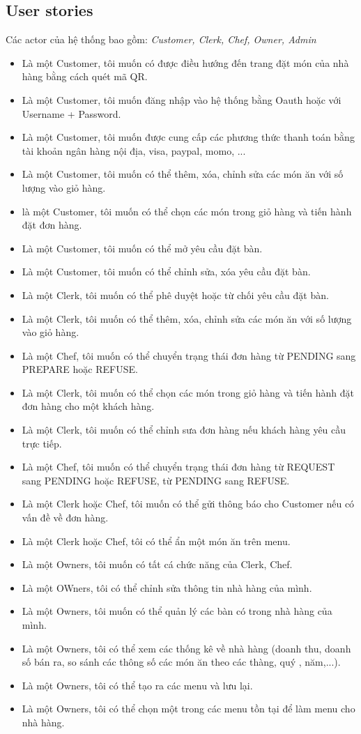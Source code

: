 \documentclass[a4paper]{article}
\begin{document}
\subsection{User stories}

Các actor của hệ thống bao gồm: \textit{Customer, Clerk, Chef, Owner, Admin}
\begin{itemize}
    \item Là một Customer, tôi muốn có được điều hướng đến trang đặt món của nhà hàng bằng cách quét mã QR.
    \item Là một Customer, tôi muốn đăng nhập vào hệ thống bằng Oauth hoặc với Username + Password.
    \item Là một Customer, tôi muốn được cung cấp các phương thức thanh toán bằng tài khoản ngân hàng nội địa, visa, paypal, momo, ... 
    \item Là một Customer, tôi muốn có thể thêm, xóa, chỉnh sửa các món ăn với số lượng vào giỏ hàng.
    \item là một Customer, tôi muốn có thể chọn các món trong giỏ hàng và tiến hành đặt đơn hàng.
    \item Là một Customer, tôi muốn có thể mở yêu cầu đặt bàn.
    \item Là một Customer, tôi muốn có thể chỉnh sửa, xóa yêu cầu đặt bàn.
    \item Là một Clerk, tôi muốn có thể phê duyệt hoặc từ chối yêu cầu đặt bàn.
    \item Là một Clerk, tôi muốn có thể thêm, xóa, chỉnh sửa các món ăn với số lượng vào giỏ hàng.
    \item Là một Chef, tôi muốn có thể chuyển trạng thái đơn hàng từ PENDING sang PREPARE hoặc REFUSE.
    \item Là một Clerk, tôi muốn có thể chọn các món trong giỏ hàng và tiến hành đặt đơn hàng cho một khách hàng.
    \item Là một Clerk, tôi muốn có thể chỉnh sưa đơn hàng nếu khách hàng yêu cầu trực tiếp.
    \item Là một Chef, tôi muốn có thể chuyển trạng thái đơn hàng từ REQUEST sang PENDING hoặc REFUSE, từ PENDING sang REFUSE.
    \item Là một Clerk hoặc Chef, tôi muốn có thể gửi thông báo cho Customer nếu có vấn đề về đơn hàng.
    \item Là một Clerk hoặc Chef, tôi có thể ẩn một món ăn trên menu.
    \item Là một Owners, tôi muốn có tất cá chức năng của Clerk, Chef.
    \item Là một OWners, tôi có thể chỉnh sửa thông tin nhà hàng của mình.
    \item Là một Owners, tôi muốn có thể quản lý các bàn có trong nhà hàng của mình.
    \item Là một Owners, tôi có thể xem các thống kê về nhà hàng (doanh thu, doanh số bán ra, so sánh các thông số các món ăn theo các thàng, quý , năm,...).
    \item Là một Owners, tôi có thể tạo ra các menu và lưu lại.
    \item Là một Owners, tôi có thể chọn một trong các menu tồn tại để làm menu cho nhà hàng.
\end{itemize}
\end{document}
